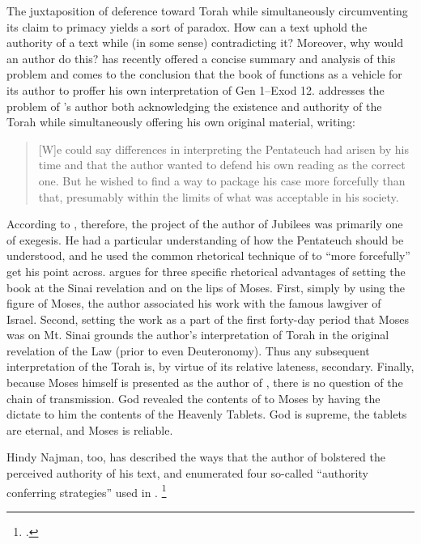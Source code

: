 The juxtaposition of deference toward Torah while simultaneously circumventing its claim to primacy yields a sort of \psgraphical paradox. How can a text uphold the authority of a text while (in some sense) contradicting it? Moreover, why would an author do this? \vanderkam has recently offered a concise summary and analysis of this problem and comes to the conclusion that the book of \jub functions as a vehicle for its author to proffer his own interpretation of Gen 1--Exod 12. \vanderkam addresses the problem of \jub's author both acknowledging the existence and authority of the Torah while simultaneously offering his own original material, writing:

\begin{quote}
    [W]e could say differences in interpreting the Pentateuch had arisen by his time and that the author wanted to defend his own reading as the correct one. But he wished to find a way to package his case more forcefully than that, presumably within the limits of what was acceptable in his society.\autocite[28]{vanderkam_metso-etal2010}
\end{quote}

According to \vanderkam, therefore, the project of the author of Jubilees was primarily one of exegesis. He had a particular understanding of how the Pentateuch should be understood, and he used the common rhetorical technique of \psy to ``more forcefully'' get his point across.%
    \autocite[28]{vanderkam_metso-etal2010}
\vanderkam argues for three specific rhetorical advantages of setting the book at the Sinai revelation and on the lips of Moses. First, simply by using the figure of Moses, the author associated his work with the famous lawgiver of Israel. Second, setting the work as a part of the first forty-day period that Moses was on Mt. Sinai grounds the author's interpretation of Torah in the original revelation of the Law (prior to even Deuteronomy). Thus any subsequent interpretation of the Torah is, by virtue of its relative lateness, secondary. Finally, because Moses himself is presented as the author of \jub, there is no question of the chain of transmission. God revealed the contents of \jub to Moses by having the \ap dictate to him the contents of the Heavenly Tablets. God is supreme, the tablets are eternal, and Moses is reliable.

Hindy Najman, too, has described the ways that the author of \jub bolstered the perceived authority of his text, and enumerated four so-called ``authority conferring strategies'' used in \jub.%
    \footnote{\cite[380]{najman_jsj1999}.}


